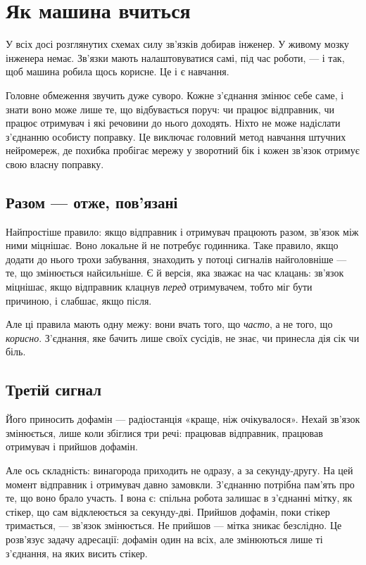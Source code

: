 \chapter{Як машина вчиться}

У всіх досі розглянутих схемах силу зв'язків добирав інженер. У живому мозку інженера немає. Зв'язки мають налаштовуватися самі, під час роботи, --- і так, щоб машина робила щось корисне. Це і є навчання.

Головне обмеження звучить дуже суворо. Кожне з'єднання змінює себе саме, і знати воно може лише те, що відбувається поруч: чи працює відправник, чи працює отримувач і які речовини до нього доходять. Ніхто не може надіслати з'єднанню особисту поправку. Це виключає головний метод навчання штучних нейромереж, де похибка пробігає мережу у зворотний бік і кожен зв'язок отримує свою власну поправку.

\section*{Разом --- отже, пов'язані}

Найпростіше правило: якщо відправник і отримувач працюють разом, зв'язок між ними міцнішає. Воно локальне й не потребує годинника. Таке правило, якщо додати до нього трохи забування, знаходить у потоці сигналів найголовніше --- те, що змінюється найсильніше. Є й версія, яка зважає на час клацань: зв'язок міцнішає, якщо відправник клацнув \emph{перед} отримувачем, тобто міг бути причиною, і слабшає, якщо після.

Але ці правила мають одну межу: вони вчать того, що \emph{часто}, а не того, що \emph{корисно}. З'єднання, яке бачить лише своїх сусідів, не знає, чи принесла дія сік чи біль.

\section*{Третій сигнал}

Його приносить дофамін --- радіостанція «краще, ніж очікувалося». Нехай зв'язок змінюється, лише коли збіглися три речі: працював відправник, працював отримувач і прийшов дофамін.


Але ось складність: винагорода приходить не одразу, а за секунду-другу. На цей момент відправник і отримувач давно замовкли. З'єднанню потрібна пам'ять про те, що воно брало участь. І вона є: спільна робота залишає в з'єднанні мітку, як стікер, що сам відклеюється за секунду-дві. Прийшов дофамін, поки стікер тримається, --- зв'язок змінюється. Не прийшов --- мітка зникає безслідно. Це розв'язує задачу адресації: дофамін один на всіх, але змінюються лише ті з'єднання, на яких висить стікер.

